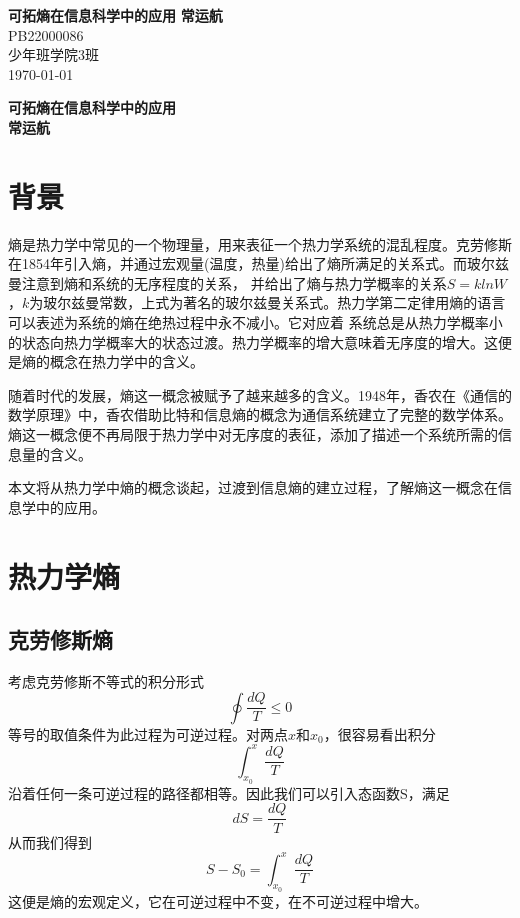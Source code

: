 \documentclass{ctexart}
\begin{document}
\begin{titlepage}
   \begin{center}
    \vspace*{1cm}
    \Huge
    \textbf{可拓熵在信息科学中的应用}
    \vspace{0.3cm}
    \vfill
    \huge
    \textbf{常运航}\\
    \vspace{0.8cm}
    \vspace{1.5cm}
    \LARGE      
    PB22000086\\
    少年班学院3班\\
    \today\\
   \end{center}
\end{titlepage}
\pagestyle{empty}
\begin{center}
    \huge
    \textbf{可拓熵在信息科学中的应用}
    \\
    \vspace{0.4cm}
    \LARGE
    \vspace{0.4cm}
    \textbf{常运航}
\end{center}
\section{背景}
熵是热力学中常见的一个物理量，用来表征一个热力学系统的混乱程度。克劳修斯在1854年引入熵，并通过宏观量(温度，热量)给出了熵所满足的关系式。而玻尔兹曼注意到熵和系统的无序程度的关系，
并给出了熵与热力学概率的关系$S=klnW$，$k$为玻尔兹曼常数，上式为著名的玻尔兹曼关系式。热力学第二定律用熵的语言可以表述为系统的熵在绝热过程中永不减小。它对应着
系统总是从热力学概率小的状态向热力学概率大的状态过渡。热力学概率的增大意味着无序度的增大。这便是熵的概念在热力学中的含义。
\par
随着时代的发展，熵这一概念被赋予了越来越多的含义。1948年，香农在《通信的数学原理》\cite{Com}中，香农借助比特和信息熵的概念为通信系统建立了完整的数学体系。
熵这一概念便不再局限于热力学中对无序度的表征，添加了描述一个系统所需的信息量的含义。
\par 
本文将从热力学中熵的概念谈起，过渡到信息熵的建立过程，了解熵这一概念在信息学中的应用。
\section{热力学熵}
\subsection{克劳修斯熵}
考虑克劳修斯不等式的积分形式
\begin{equation}
    \oint \frac{dQ}{T} \leq 0
\end{equation}
等号的取值条件为此过程为可逆过程。对两点$x$和$x_0$，很容易看出积分
\begin{equation}
    \int_{x_0}^{x} \frac{dQ}{T}
\end{equation}
沿着任何一条可逆过程的路径都相等。因此我们可以引入态函数S，满足
\begin{equation}
    dS=\frac{dQ}{T}
\end{equation}
从而我们得到
\begin{equation}
    S-S_0=\int_{x_0}^{x} \frac{dQ}{T}
\end{equation}
这便是熵的宏观定义，它在可逆过程中不变，在不可逆过程中增大。
\end{document}
